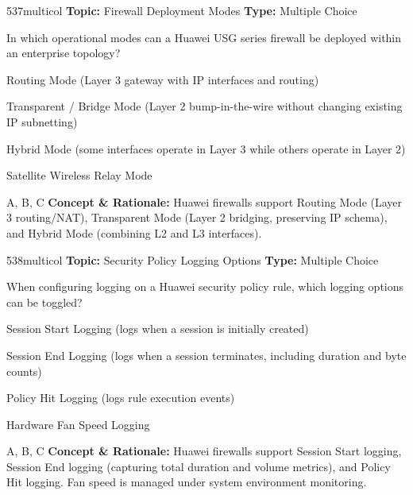 \begin{qcard}{537}{multicol}
\textcolor{darkslate!75}{\small\textbf{Topic:} Firewall Deployment Modes \hfill \textbf{Type:} Multiple Choice}\vspace{0.4em}\par
In which operational modes can a Huawei USG series firewall be deployed within an enterprise topology?
\begin{qoptions}
\item Routing Mode (Layer 3 gateway with IP interfaces and routing)
\item Transparent / Bridge Mode (Layer 2 bump-in-the-wire without changing existing IP subnetting)
\item Hybrid Mode (some interfaces operate in Layer 3 while others operate in Layer 2)
\item Satellite Wireless Relay Mode
\end{qoptions}
\end{qcard}
\nopagebreak
\begin{explainbox}{A, B, C}
\textbf{Concept \& Rationale:} Huawei firewalls support Routing Mode (Layer 3 routing/NAT), Transparent Mode (Layer 2 bridging, preserving IP schema), and Hybrid Mode (combining L2 and L3 interfaces).
\end{explainbox}

\begin{qcard}{538}{multicol}
\textcolor{darkslate!75}{\small\textbf{Topic:} Security Policy Logging Options \hfill \textbf{Type:} Multiple Choice}\vspace{0.4em}\par
When configuring logging on a Huawei security policy rule, which logging options can be toggled?
\begin{qoptions}
\item Session Start Logging (logs when a session is initially created)
\item Session End Logging (logs when a session terminates, including duration and byte counts)
\item Policy Hit Logging (logs rule execution events)
\item Hardware Fan Speed Logging
\end{qoptions}
\end{qcard}
\nopagebreak
\begin{explainbox}{A, B, C}
\textbf{Concept \& Rationale:} Huawei firewalls support Session Start logging, Session End logging (capturing total duration and volume metrics), and Policy Hit logging. Fan speed is managed under system environment monitoring.
\end{explainbox}

